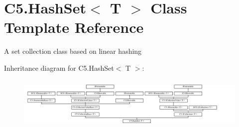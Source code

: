 \hypertarget{class_c5_1_1_hash_set}{}\section{C5.\+Hash\+Set$<$ T $>$ Class Template Reference}
\label{class_c5_1_1_hash_set}


A set collection class based on linear hashing  


Inheritance diagram for C5.\+Hash\+Set$<$ T $>$\+:\begin{figure}[H]
\begin{center}
\leavevmode
\includegraphics[height=2.526316cm]{class_c5_1_1_hash_set}
\end{center}
\end{figure}
